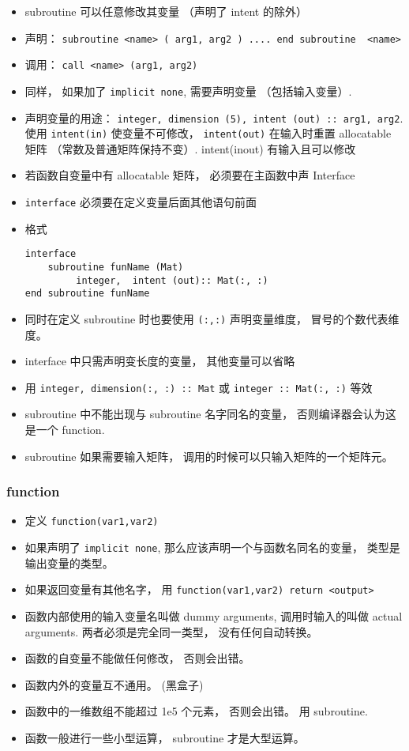 \begin{itemize}
\item subroutine 可以任意修改其变量 （声明了 intent 的除外）
\item 声明： \verb`subroutine <name> ( arg1, arg2 ) .... end subroutine  <name>`
\item 调用：  \verb`call <name> (arg1, arg2)`
\item 同样， 如果加了 \verb`implicit none`,  需要声明变量 （包括输入变量）.
\item 声明变量的用途： \verb`integer, dimension (5), intent (out) :: arg1, arg2`. 使用 \verb`intent(in)` 使变量不可修改， \verb`intent(out)` 在输入时重置 allocatable 矩阵 （常数及普通矩阵保持不变）. intent(inout) 有输入且可以修改
\item 若函数自变量中有 allocatable 矩阵， 必须要在主函数中声 Interface
\item \verb`interface` 必须要在定义变量后面其他语句前面
\item 格式
\begin{lstlisting}[language=none]
interface
    subroutine funName (Mat)
         integer,  intent (out):: Mat(:, :)
end subroutine funName
\end{lstlisting}
\item 同时在定义 subroutine 时也要使用 \verb`(:,:)` 声明变量维度， 冒号的个数代表维度。
\item interface 中只需声明变长度的变量， 其他变量可以省略
\item 用 \verb`integer, dimension(:, :) :: Mat` 或 \verb`integer :: Mat(:, :)` 等效
\item subroutine 中不能出现与 subroutine 名字同名的变量， 否则编译器会认为这是一个 function.
\item subroutine 如果需要输入矩阵， 调用的时候可以只输入矩阵的一个矩阵元。
\end{itemize}

\subsubsection{function}
\begin{itemize}
\item 定义 \verb`function(var1,var2)`
\item 如果声明了 \verb`implicit none`, 那么应该声明一个与函数名同名的变量， 类型是输出变量的类型。
\item 如果返回变量有其他名字， 用 \verb`function(var1,var2) return <output>`
\item 函数内部使用的输入变量名叫做 dummy arguments, 调用时输入的叫做 actual arguments. 两者必须是完全同一类型， 没有任何自动转换。
\item 函数的自变量不能做任何修改， 否则会出错。
\item 函数内外的变量互不通用。 (黑盒子)
\item 函数中的一维数组不能超过 1e5 个元素， 否则会出错。 用 subroutine.
\item 函数一般进行一些小型运算， subroutine 才是大型运算。
\end{itemize}

